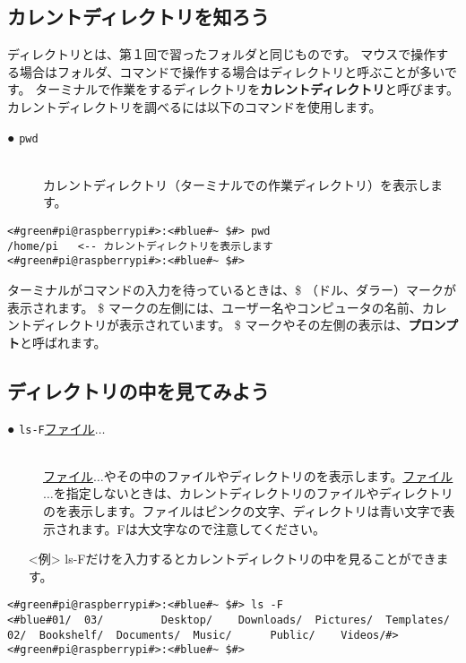 \subsection{カレントディレクトリを知ろう}
ディレクトリとは、第１回で習ったフォルダと同じものです。
マウスで操作する場合はフォルダ、コマンドで操作する場合はディレクトリと呼ぶことが多いです。
ターミナルで作業をするディレクトリを{\bf カレントディレクトリ}と呼びます。
カレントディレクトリを調べるには以下のコマンドを使用します。

\begin{description}
\item[● \texttt{pwd}]\mbox{}\\
 カレントディレクトリ（ターミナルでの作業ディレクトリ）を表示します。
\end{description}

\begin{lstlisting}[caption=pwdコマンドの例,label=pwdtest]
<#green#pi@raspberrypi#>:<#blue#~ $#> pwd
/home/pi   <-- カレントディレクトリを表示します
<#green#pi@raspberrypi#>:<#blue#~ $#>
\end{lstlisting}

ターミナルがコマンドの入力を待っているときは、\$ （ドル、ダラー）マークが表示されます。
\$ マークの左側には、ユーザー名やコンピュータの名前、カレントディレクトリが表示されています。
\$ マークやその左側の表示は、{\bf プロンプト}と呼ばれます。

\subsection{ディレクトリの中を見てみよう}
\begin{description}
\item[● \texttt{ls}\textvisiblespace \texttt{-F}\textvisiblespace \underline{ファイル}$\ldots$]\mbox{}\\
\underline{ファイル}$\ldots$やその中のファイルやディレクトリのを表示します。\underline{ファイル}$\ldots$を指定しないときは、カレントディレクトリのファイルやディレクトリのを表示します。ファイルはピンクの文字、ディレクトリは青い文字で表示されます。Fは大文字なので注意してください。
\end{description}
\begin{itemize}
  \item[<例>] ls\textvisiblespace -Fだけを入力するとカレントディレクトリの中を見ることができます。
\end{itemize}

\begin{lstlisting}[caption=ls -F コマンドの例。ファイルやディレクトリが表示されます,label=lsFtest]
<#green#pi@raspberrypi#>:<#blue#~ $#> ls -F
<#blue#01/  03/         Desktop/    Downloads/  Pictures/  Templates/
02/  Bookshelf/  Documents/  Music/      Public/    Videos/#>
<#green#pi@raspberrypi#>:<#blue#~ $#>
\end{lstlisting}

